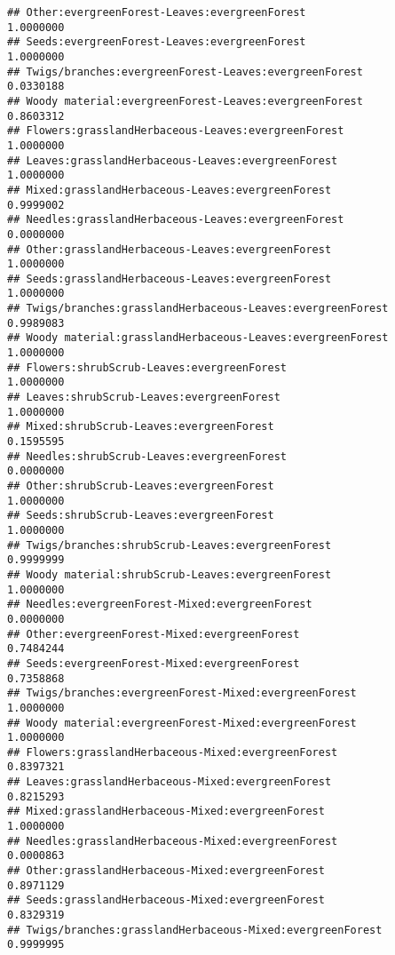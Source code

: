 \documentclass[
]{article}
\begin{document}
\begin{verbatim}
## Other:evergreenForest-Leaves:evergreenForest                          1.0000000
## Seeds:evergreenForest-Leaves:evergreenForest                          1.0000000
## Twigs/branches:evergreenForest-Leaves:evergreenForest                 0.0330188
## Woody material:evergreenForest-Leaves:evergreenForest                 0.8603312
## Flowers:grasslandHerbaceous-Leaves:evergreenForest                    1.0000000
## Leaves:grasslandHerbaceous-Leaves:evergreenForest                     1.0000000
## Mixed:grasslandHerbaceous-Leaves:evergreenForest                      0.9999002
## Needles:grasslandHerbaceous-Leaves:evergreenForest                    0.0000000
## Other:grasslandHerbaceous-Leaves:evergreenForest                      1.0000000
## Seeds:grasslandHerbaceous-Leaves:evergreenForest                      1.0000000
## Twigs/branches:grasslandHerbaceous-Leaves:evergreenForest             0.9989083
## Woody material:grasslandHerbaceous-Leaves:evergreenForest             1.0000000
## Flowers:shrubScrub-Leaves:evergreenForest                             1.0000000
## Leaves:shrubScrub-Leaves:evergreenForest                              1.0000000
## Mixed:shrubScrub-Leaves:evergreenForest                               0.1595595
## Needles:shrubScrub-Leaves:evergreenForest                             0.0000000
## Other:shrubScrub-Leaves:evergreenForest                               1.0000000
## Seeds:shrubScrub-Leaves:evergreenForest                               1.0000000
## Twigs/branches:shrubScrub-Leaves:evergreenForest                      0.9999999
## Woody material:shrubScrub-Leaves:evergreenForest                      1.0000000
## Needles:evergreenForest-Mixed:evergreenForest                         0.0000000
## Other:evergreenForest-Mixed:evergreenForest                           0.7484244
## Seeds:evergreenForest-Mixed:evergreenForest                           0.7358868
## Twigs/branches:evergreenForest-Mixed:evergreenForest                  1.0000000
## Woody material:evergreenForest-Mixed:evergreenForest                  1.0000000
## Flowers:grasslandHerbaceous-Mixed:evergreenForest                     0.8397321
## Leaves:grasslandHerbaceous-Mixed:evergreenForest                      0.8215293
## Mixed:grasslandHerbaceous-Mixed:evergreenForest                       1.0000000
## Needles:grasslandHerbaceous-Mixed:evergreenForest                     0.0000863
## Other:grasslandHerbaceous-Mixed:evergreenForest                       0.8971129
## Seeds:grasslandHerbaceous-Mixed:evergreenForest                       0.8329319
## Twigs/branches:grasslandHerbaceous-Mixed:evergreenForest              0.9999995

\end{verbatim}
\end{document}

